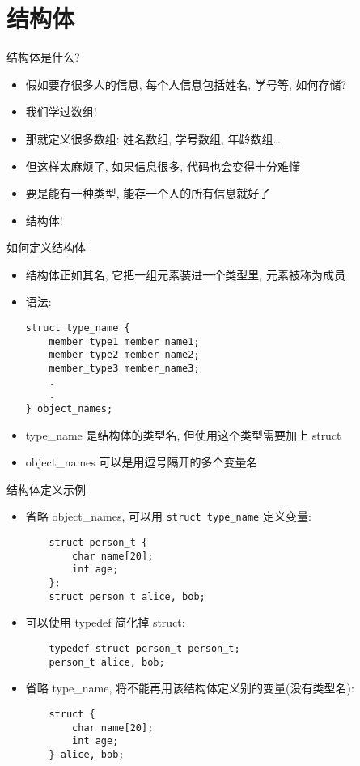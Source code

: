 \section{结构体}\label{sec:结构体}

\begin{frame}[fragile]{结构体是什么?}
    \begin{itemize}[<+- | alert@+>]
        \item 假如要存很多人的信息, 每个人信息包括姓名, 学号等, 如何存储?
        \item 我们学过数组!
        \item 那就定义很多数组: 姓名数组, 学号数组, 年龄数组\ldots
        \item 但这样太麻烦了, 如果信息很多, 代码也会变得十分难懂
        \item 要是能有一种类型, 能存一个人的所有信息就好了
        \item 结构体!
    \end{itemize}
\end{frame}

\begin{frame}[fragile]{如何定义结构体}
    \begin{itemize}[<+- | alert@+>]
        \item 结构体正如其名, 它把一组元素装进一个类型里, 元素被称为成员
        \item 语法:
        \begin{verbatim}
struct type_name {
    member_type1 member_name1;
    member_type2 member_name2;
    member_type3 member_name3;
    .
    .
} object_names;
        \end{verbatim}
        \item type\_name 是结构体的类型名, 但使用这个类型需要加上 struct
        \item object\_names 可以是用逗号隔开的多个变量名
    \end{itemize}
\end{frame}

\begin{frame}[fragile]{结构体定义示例}
    \begin{itemize}[<+- | alert@+>]
        \item 省略 object\_names, 可以用 \texttt{struct type\_name} 定义变量:
        \scriptsize\begin{verbatim}
    struct person_t {
        char name[20];
        int age;
    };
    struct person_t alice, bob;
        \end{verbatim}
        \item 可以使用 typedef 简化掉 struct:
        \scriptsize\begin{verbatim}
    typedef struct person_t person_t;
    person_t alice, bob;
        \end{verbatim}
        \item 省略 type\_name, 将不能再用该结构体定义别的变量(没有类型名):
        \scriptsize\begin{verbatim}
    struct {
        char name[20];
        int age;
    } alice, bob;
        \end{verbatim}
    \end{itemize}
\end{frame}

